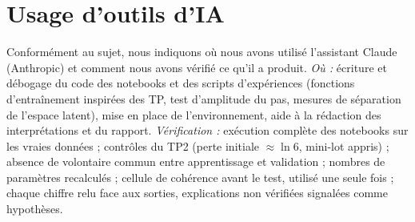 \documentclass[10pt,a4paper]{article}
\begin{document}
\section*{Usage d'outils d'IA}       %
Conformément au sujet, nous indiquons où nous avons utilisé l'assistant Claude (Anthropic) et comment nous avons
vérifié ce qu'il a produit.
\emph{Où :} écriture et débogage du code des notebooks et des scripts d'expériences (fonctions d'entraînement
inspirées des TP, test d'amplitude du pas, mesures de séparation de l'espace latent), mise en place de
l'environnement, aide à la rédaction des interprétations et du rapport.
\emph{Vérification :} exécution complète des notebooks sur les vraies données ; contrôles du TP2 (perte initiale
$\approx \ln 6$, mini-lot appris) ; absence de volontaire commun entre apprentissage et validation ; nombres de
paramètres recalculés ; cellule de cohérence avant le test, utilisé une seule fois ; chaque chiffre relu face aux
sorties, explications non vérifiées signalées comme hypothèses.
\end{document}
